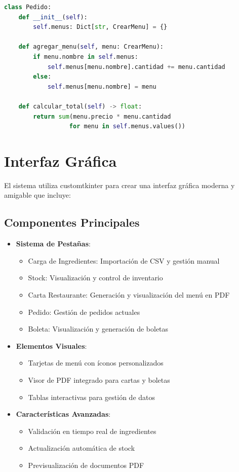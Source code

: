 \documentclass[12pt,letterpaper]{article}
\begin{document}
\begin{lstlisting}[language=Python, caption=Implementación de Pedido]
class Pedido:
    def __init__(self):
        self.menus: Dict[str, CrearMenu] = {}
    
    def agregar_menu(self, menu: CrearMenu):
        if menu.nombre in self.menus:
            self.menus[menu.nombre].cantidad += menu.cantidad
        else:
            self.menus[menu.nombre] = menu
    
    def calcular_total(self) -> float:
        return sum(menu.precio * menu.cantidad 
                  for menu in self.menus.values())
\end{lstlisting}

\section{Interfaz Gráfica}
El sistema utiliza customtkinter para crear una interfaz gráfica moderna y amigable que incluye:

\subsection{Componentes Principales}
\begin{itemize}
    \item \textbf{Sistema de Pestañas}:
        \begin{itemize}
            \item Carga de Ingredientes: Importación de CSV y gestión manual
            \item Stock: Visualización y control de inventario
            \item Carta Restaurante: Generación y visualización del menú en PDF
            \item Pedido: Gestión de pedidos actuales
            \item Boleta: Visualización y generación de boletas
        \end{itemize}
    \item \textbf{Elementos Visuales}:
        \begin{itemize}
            \item Tarjetas de menú con íconos personalizados
            \item Visor de PDF integrado para cartas y boletas
            \item Tablas interactivas para gestión de datos
        \end{itemize}
    \item \textbf{Características Avanzadas}:
        \begin{itemize}
            \item Validación en tiempo real de ingredientes
            \item Actualización automática de stock
            \item Previsualización de documentos PDF
        \end{itemize}
\end{itemize}
\end{document}
